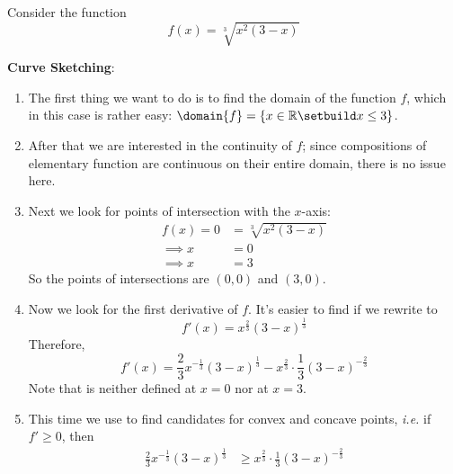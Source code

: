 \begin{exm}\label{exm-curve-sketching}
	Consider the function
	\begin{equation}\label{eq-curve-sketching}
		f(x)=\sqrt[3]{x^2(3-x)}
	\end{equation}
	\begin{flushleft}
		\textbf{Curve Sketching}:
		\begin{enumerate}
			\item The first thing we want to do is to find the domain of the
			      function $f$, which in this case is rather easy: $\domain{f}=\left\{x\in\mathbb{R}\setbuild x\leq3\right\}$.
			\item After that we are interested in the continuity of $f$; since compositions of
			      elementary function are continuous on their entire domain, there is no issue here.
			\item Next we look for points of intersection with the $x$-axis:
			      \begin{align*}
				      f(x) = 0   & = \sqrt[3]{x^2(3-x)} \\
				      \implies x & = 0                  \\
				      \implies x & = 3
			      \end{align*}
			      So the points of intersections are $(0,0)$ and $(3,0)$.
			\item Now we look for the first derivative of $f$. It's easier to find
			      if we rewrite  to
			      \begin{equation}\label{eq-curve-sketching:2}
				      f'(x)=x^{\frac{2}{3}}(3-x)^{\frac{1}{3}}
			      \end{equation}
			      Therefore,
			      \begin{equation}\label{eq-curve-sketching:3}
				      f'(x) = \frac{2}{3}x^{-\frac{1}{3}}(3-x)^{\frac{1}{3}} - x^{\frac{2}{3}}\cdot\frac{1}{3}(3-x)^{-\frac{2}{3}}
			      \end{equation}
			      Note that  is neither defined at
			      $x=0$ nor at $x=3$.
			\item This time we use 
			      to find candidates for convex and concave points, \textit{i.e.} if $f' \geq 0$, then
			      \begin{align*}
				      \frac{2}{3}x^{-\frac{1}{3}}(3-x)^{\frac{1}{3}}      & \geq x^{\frac{2}{3}}\cdot\frac{1}{3}(3-x)^{-\frac{2}{3}}                    \\

\end{align*}
\end{enumerate}
\end{flushleft}
\end{exm}
